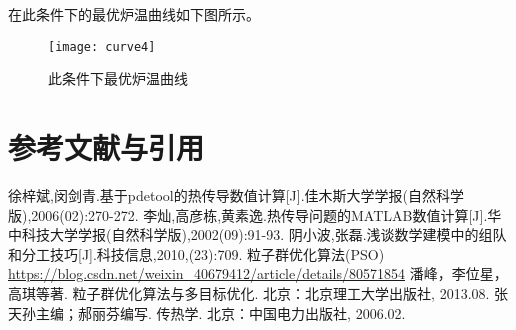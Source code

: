 \documentclass[withoutpreface,bwprint]{cumcmthesis} %
\begin{document}
在此条件下的最优炉温曲线如下图所示。
\newpage
\begin{figure}[!h]
	\centering
	\texttt{[image: curve4]}
	\caption{此条件下最优炉温曲线}
	\label{fig:cur4}
\end{figure}


\newpage
\section{参考文献与引用}

\begin{thebibliography}{9}%
    徐梓斌,闵剑青.基于pdetool的热传导数值计算[J].佳木斯大学学报(自然科学版),2006(02):270-272.
    李灿,高彦栋,黄素逸.热传导问题的MATLAB数值计算[J].华中科技大学学报(自然科学版),2002(09):91-93.
    阴小波,张磊.浅谈数学建模中的组队和分工技巧[J].科技信息,2010,(23):709.
    粒子群优化算法(PSO) \url{https://blog.csdn.net/weixin_40679412/article/details/80571854}
    潘峰，李位星，高琪等著. 粒子群优化算法与多目标优化. 北京：北京理工大学出版社, 2013.08.
    张天孙主编；郝丽芬编写. 传热学. 北京：中国电力出版社, 2006.02.
\end{thebibliography}
\end{document}

